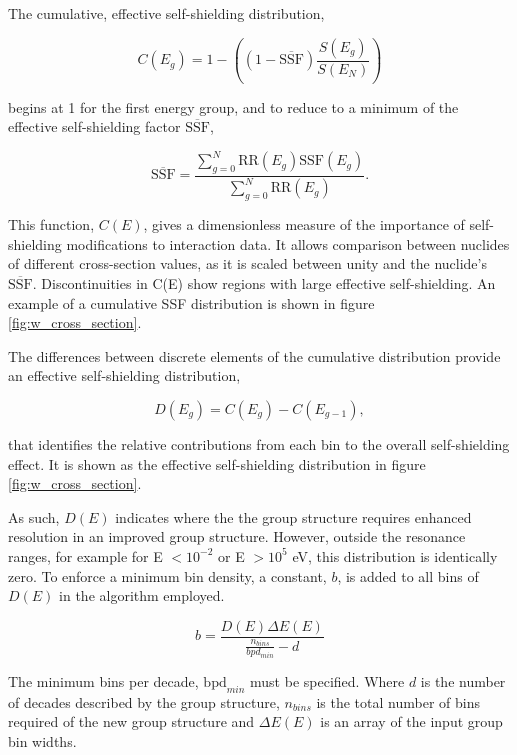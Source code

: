 The cumulative, effective self-shielding distribution,

\begin{equation}
\label{eq:c}
C(E_{g}) = 1 - \left( \left(1-\overline{\mathrm{SSF}}\right) \frac{S(E_{g})} {S(E_{N})}\right)
\end{equation}

begins at 1 for the first energy group, and to reduce to a minimum of the effective self-shielding factor $\overline{\mathrm{SSF}}$,

\begin{equation}
\label{eq:ssf_bar}
\overline{\mathrm{SSF}} = \frac{\sum_{g=0}^{N}\mathrm{RR}(E_{g})\mathrm{SSF}(E_{g})}
{\sum_{g=0}^{N}\mathrm{RR}(E_{g})}.
\end{equation}

This function, $C(E)$, gives a dimensionless measure of the importance of self-shielding modifications to interaction data. It allows comparison between nuclides of different cross-section values, as it is scaled between unity and the nuclide's $\overline{\mathrm{SSF}}$. Discontinuities in C(E) show regions with large effective self-shielding. An example of a cumulative SSF distribution is shown in figure \ref{fig:w_cross_section}. 

The differences between discrete elements of the cumulative distribution provide an effective self-shielding distribution,

\begin{equation}
\label{eq:d}
D(E_{g}) = C(E_{g}) - C(E_{g-1}),
\end{equation}

that identifies the relative contributions from each bin to the overall self-shielding effect. It is shown as the effective self-shielding distribution in figure \ref{fig:w_cross_section}.

As such, $D(E)$ indicates where the the group structure requires enhanced resolution in an improved group structure. However, outside the resonance ranges, for example for E $< 10^{-2}$ or E $> 10^{5}$ eV, this distribution is identically zero. To enforce a minimum bin density, a constant, $b$, is added to all bins of $D(E)$ in the algorithm employed. 

\begin{equation}
\label{eq:b}
b = \frac{D(E) \Delta E(E)}{\frac{n_{bins}}{bpd_{min}} - d}
\end{equation}

The minimum bins per decade, $\mathrm{bpd}_{min}$ must be specified. Where $d$ is the number of decades described by the group structure, $n_{bins}$ is the total number of bins required of the new group structure and $\Delta E(E)$ is an array of the input group bin widths.

